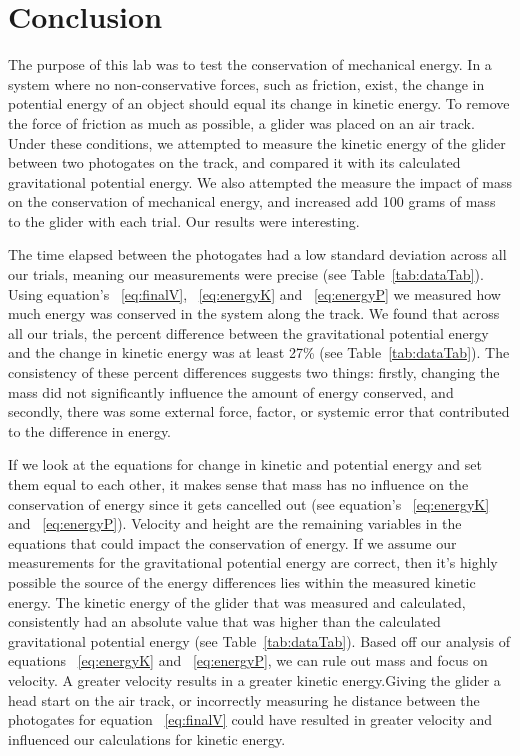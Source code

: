 
\section{Conclusion}

\vspace{-0.5cm}
\singlespacing

The purpose of this lab was to test the conservation of mechanical energy. In a system where no non-conservative forces, such as friction, exist, the change in potential energy of an object should equal its change in kinetic energy. To remove the force of friction as much as possible, a glider was placed on an air track. Under these conditions, we attempted to measure the kinetic energy of the glider between two photogates on the track, and compared it with its calculated gravitational potential energy. We also attempted the measure the impact of mass on the conservation of mechanical energy, and increased add 100 grams of mass to the glider with each trial. Our results were interesting.

The time elapsed between the photogates had a low standard deviation across all our trials, meaning our measurements were precise (see Table~\ref{tab:dataTab}). Using equation's ~\ref{eq:finalV}, ~\ref{eq:energyK} and ~\ref{eq:energyP} we measured how much energy was conserved in the system along the track. We found that across all our trials, the percent difference between the gravitational potential energy and the change in kinetic energy was at least 27\% (see Table~\ref{tab:dataTab}). The consistency of these percent differences suggests two things: firstly, changing the mass did not significantly influence the amount of energy conserved, and secondly, there was some external force, factor, or systemic error that contributed to the difference in energy. 

If we look at the equations for change in kinetic and potential energy and set them equal to each other, it makes sense that mass has no influence on the conservation of energy since it gets cancelled out (see equation's ~\ref{eq:energyK} and ~\ref{eq:energyP}). Velocity and height are the remaining variables in the equations that could impact the conservation of energy. If we assume our measurements for the gravitational potential energy are correct, then it's highly possible the source of the energy differences lies within the measured kinetic energy. The kinetic energy of the glider that was measured and calculated, consistently had an absolute value that was higher than the calculated gravitational potential energy (see Table~\ref{tab:dataTab}). Based off our analysis of equations ~\ref{eq:energyK} and ~\ref{eq:energyP}, we can rule out mass and focus on velocity. A greater velocity results in a greater kinetic energy.Giving the glider a head start on the air track, or incorrectly measuring he distance between the photogates for equation ~\ref{eq:finalV} could have resulted in greater velocity and influenced our calculations for kinetic energy. 

